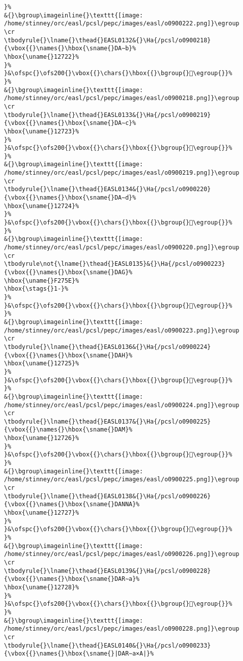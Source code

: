 \begin{verbatim}
}%
&{}\bgroup\imageinline{}\texttt{[image: /home/stinney/orc/easl/pcsl/pepc/images/easl/o0900222.png]}\egroup
\cr
\tbodyrule{}\lname{}\thead{}EASL0132&{}\Ha{/pcsl/o0900218}{\vbox{{}\names{}\hbox{\sname{}DA∼b}%
\hbox{\uname{}12722}%
}%
}&\ofspc{}\ofs200{}\vbox{{}\chars{}\hbox{{}\bgroup{}𒜢\egroup{}}%
}%
&{}\bgroup\imageinline{}\texttt{[image: /home/stinney/orc/easl/pcsl/pepc/images/easl/o0900218.png]}\egroup
\cr
\tbodyrule{}\lname{}\thead{}EASL0133&{}\Ha{/pcsl/o0900219}{\vbox{{}\names{}\hbox{\sname{}DA∼c}%
\hbox{\uname{}12723}%
}%
}&\ofspc{}\ofs200{}\vbox{{}\chars{}\hbox{{}\bgroup{}𒜣\egroup{}}%
}%
&{}\bgroup\imageinline{}\texttt{[image: /home/stinney/orc/easl/pcsl/pepc/images/easl/o0900219.png]}\egroup
\cr
\tbodyrule{}\lname{}\thead{}EASL0134&{}\Ha{/pcsl/o0900220}{\vbox{{}\names{}\hbox{\sname{}DA∼d}%
\hbox{\uname{}12724}%
}%
}&\ofspc{}\ofs200{}\vbox{{}\chars{}\hbox{{}\bgroup{}𒜤\egroup{}}%
}%
&{}\bgroup\imageinline{}\texttt{[image: /home/stinney/orc/easl/pcsl/pepc/images/easl/o0900220.png]}\egroup
\cr
\tbodyrule\not{\lname{}\thead{}EASL0135}&{}\Ha{/pcsl/o0900223}{\vbox{{}\names{}\hbox{\sname{}DAG}%
\hbox{\uname{}F275E}%
\hbox{\stags{}1-}%
}%
}&\ofspc{}\ofs200{}\vbox{{}\chars{}\hbox{{}\bgroup{}󲝞\egroup{}}%
}%
&{}\bgroup\imageinline{}\texttt{[image: /home/stinney/orc/easl/pcsl/pepc/images/easl/o0900223.png]}\egroup
\cr
\tbodyrule{}\lname{}\thead{}EASL0136&{}\Ha{/pcsl/o0900224}{\vbox{{}\names{}\hbox{\sname{}DAH}%
\hbox{\uname{}12725}%
}%
}&\ofspc{}\ofs200{}\vbox{{}\chars{}\hbox{{}\bgroup{}𒜥\egroup{}}%
}%
&{}\bgroup\imageinline{}\texttt{[image: /home/stinney/orc/easl/pcsl/pepc/images/easl/o0900224.png]}\egroup
\cr
\tbodyrule{}\lname{}\thead{}EASL0137&{}\Ha{/pcsl/o0900225}{\vbox{{}\names{}\hbox{\sname{}DAM}%
\hbox{\uname{}12726}%
}%
}&\ofspc{}\ofs200{}\vbox{{}\chars{}\hbox{{}\bgroup{}𒜦\egroup{}}%
}%
&{}\bgroup\imageinline{}\texttt{[image: /home/stinney/orc/easl/pcsl/pepc/images/easl/o0900225.png]}\egroup
\cr
\tbodyrule{}\lname{}\thead{}EASL0138&{}\Ha{/pcsl/o0900226}{\vbox{{}\names{}\hbox{\sname{}DANNA}%
\hbox{\uname{}12727}%
}%
}&\ofspc{}\ofs200{}\vbox{{}\chars{}\hbox{{}\bgroup{}𒜧\egroup{}}%
}%
&{}\bgroup\imageinline{}\texttt{[image: /home/stinney/orc/easl/pcsl/pepc/images/easl/o0900226.png]}\egroup
\cr
\tbodyrule{}\lname{}\thead{}EASL0139&{}\Ha{/pcsl/o0900228}{\vbox{{}\names{}\hbox{\sname{}DAR∼a}%
\hbox{\uname{}12728}%
}%
}&\ofspc{}\ofs200{}\vbox{{}\chars{}\hbox{{}\bgroup{}𒜨\egroup{}}%
}%
&{}\bgroup\imageinline{}\texttt{[image: /home/stinney/orc/easl/pcsl/pepc/images/easl/o0900228.png]}\egroup
\cr
\tbodyrule{}\lname{}\thead{}EASL0140&{}\Ha{/pcsl/o0900233}{\vbox{{}\names{}\hbox{\sname{}|DAR∼a×A|}%

\end{verbatim}
